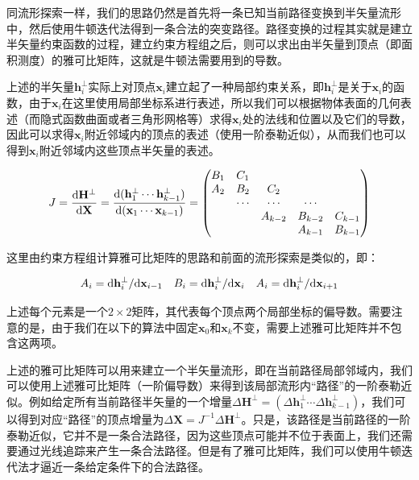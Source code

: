 同流形探索一样，我们的思路仍然是首先将一条已知当前路径变换到半矢量流形中，然后使用牛顿迭代法得到一条合法的突变路径。路径变换的过程其实就是建立半矢量约束函数的过程，建立约束方程组之后，则可以求出由半矢量到顶点（即面积测度）的雅可比矩阵，这就是牛顿法需要用到的导数。

上述的半矢量$\mathbf{h}^{\perp}_{i}$实际上对顶点$\mathbf{x}_i$建立起了一种局部约束关系，即$\mathbf{h}^{\perp}_{i}$是关于$\mathbf{x}_i$的函数，由于$\mathbf{x}_i$在这里使用局部坐标系进行表述，所以我们可以根据物体表面的几何表述（而隐式函数曲面或者三角形网格等）求得$\mathbf{x}_i$处的法线和位置以及它们的导数，因此可以求得$\mathbf{x}_i$附近邻域内的顶点的表述（使用一阶泰勒近似），从而我们也可以得到$\mathbf{x}_i$附近邻域内这些顶点半矢量的表述。

\begin{equation}\label{e:mlt-hslt-jacobian}
	J=\frac{{\rm d}\mathbf{H}^{\perp}}{{\rm d}\mathbf{X}}=\frac{{\rm d}(\mathbf{h}^{\perp}_1\cdots\mathbf{h}^{\perp}_{k-1})}{{\rm d}(\mathbf{x}_1\cdots\mathbf{x}_{k-1})}=\begin{pmatrix}
		B_1 & C_1    &         &         &\\
		A_2 & B_2    &  C_2    &         &\\
		    & \cdots & \cdots  & \cdots  &\\
		    &        & A_{k-2} & B_{k-2} & C_{k-1}\\
		    &        &         & A_{k-1} & B_{k-1}
	\end{pmatrix}
\end{equation}

\noindent 这里由约束方程组计算雅可比矩阵的思路和前面的流形探索是类似的，即：

\begin{equation}
\begin{aligned}
	A_i={\rm d}\mathbf{h}^{\perp}_i/{\rm d}\mathbf{x}_{i-1} && B_i={\rm d}\mathbf{h}^{\perp}_i/{\rm d}\mathbf{x}_i && A_i={\rm d}\mathbf{h}^{\perp}_i/{\rm d}\mathbf{x}_{i+1} 
\end{aligned}
\end{equation}

\noindent 上述每个元素是一个$2\times 2$矩阵，其代表每个顶点两个局部坐标的偏导数。需要注意的是，由于我们在以下的算法中固定$\mathbf{x}_0$和$\mathbf{x}_k$不变，需要上述雅可比矩阵并不包含这两项。

上述的雅可比矩阵可以用来建立一个半矢量流形，即在当前路径局部邻域内，我们可以使用上述雅可比矩阵（一阶偏导数）来得到该局部流形内“路径”的一阶泰勒近似。例如给定所有当前路径半矢量的一个增量$\Delta\mathbf{H}^{\perp}=(\Delta\mathbf{h}^{\perp}_1\cdots\Delta\mathbf{h}^{\perp}_{k-1})$，我们可以得到对应“路径”的顶点增量为$\Delta\mathbf{X}=J^{-1}\Delta\mathbf{H}^{\perp}$。只是，该路径是当前路径的一阶泰勒近似，它并不是一条合法路径，因为这些顶点可能并不位于表面上，我们还需要通过光线追踪来产生一条合法路径。但是有了雅可比矩阵，我们可以使用牛顿迭代法才逼近一条给定条件下的合法路径。

